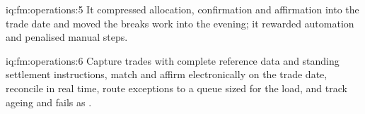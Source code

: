 \begin{solution}{iq:fm:operations:5}
It compressed allocation, confirmation and affirmation into the trade date and moved the breaks work into the evening; it rewarded automation and
penalised manual steps.
\end{solution}

\begin{solution}{iq:fm:operations:6}
Capture trades with complete reference data and standing settlement instructions, match and affirm electronically on the trade date, reconcile in
real time, route exceptions to a queue sized for the load, and track ageing and fails as .
\end{solution}
